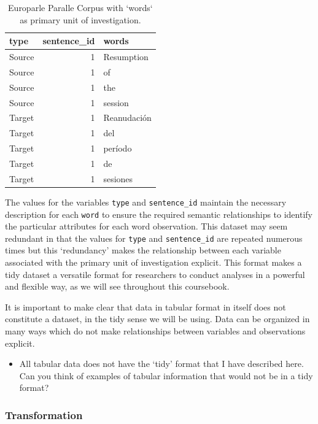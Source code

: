 \documentclass[
]{article}
\newenvironment{rmdblock}[1]
  {\begin{shaded*}
  \begin{itemize}
  \renewcommand{\labelitemi}{
    \raisebox{-.5\height}[0pt][0pt]{
      {\setkeys{Gin}{width=2em,keepaspectratio}\texttt{[image: assets/images/\#1]}}
    }
  }
  \item
  }
  {
  \end{itemize}
  \end{shaded*}
  }
\newenvironment{rmdquestion}
  {\begin{rmdblock}{question}}
  {\end{rmdblock}}
\begin{document}
\begin{table}

\caption{\label{tab:tidy-words-europarle}Europarle Paralle Corpus with `words` as primary unit of investigation.}
\centering
\begin{tabular}[t]{lrl}
\toprule
type & sentence\_id & words\\
\midrule
Source & 1 & Resumption\\
Source & 1 & of\\
Source & 1 & the\\
Source & 1 & session\\
Target & 1 & Reanudación\\
\addlinespace
Target & 1 & del\\
Target & 1 & período\\
Target & 1 & de\\
Target & 1 & sesiones\\
\bottomrule
\end{tabular}
\end{table}

The values for the variables \texttt{type} and \texttt{sentence\_id} maintain the necessary description for each \texttt{word} to ensure the required semantic relationships to identify the particular attributes for each word observation. This dataset may seem redundant in that the values for \texttt{type} and \texttt{sentence\_id} are repeated numerous times but this `redundancy' makes the relationship between each variable associated with the primary unit of investigation explicit. This format makes a tidy dataset a versatile format for researchers to conduct analyses in a powerful and flexible way, as we will see throughout this coursebook.

It is important to make clear that data in tabular format in itself does not constitute a dataset, in the tidy sense we will be using. Data can be organized in many ways which do not make relationships between variables and observations explicit.

\begin{rmdquestion}
All tabular data does not have the `tidy' format that I have described
here. Can you think of examples of tabular information that would not be
in a tidy format?
\end{rmdquestion}

\hypertarget{transformation}{%
\subsubsection{Transformation}\label{transformation}}
\end{document}
